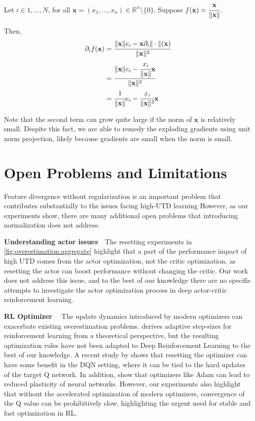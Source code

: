 Let $i \in {1, ..., N}$, for all $\mathbf{x} = (x_1, ..., x_n) \in \mathbb{R}^n \setminus \{0\}$. Suppose $f(\mathbf{x}) = \cfrac{\mathbf{x}}{\| \mathbf{x} \|}$. 

Then, 
\begin{align}
    \partial_i f(\mathbf{x}) 
    &= \cfrac{\| \mathbf{x} \| e_i - \mathbf{x} \partial_i \| \cdot \| (\mathbf{x}) }{\|\mathbf{x} \|^2} \\
    &= \cfrac{\| \mathbf{x} \| e_i - \cfrac{x_i}{\|\mathbf{x} \|} \mathbf{x}}{\|\mathbf{x} \|^2} \\
    &= \cfrac{1}{\|\mathbf{x} \|} e_i - \cfrac{x_i}{\|\mathbf{x} \|^3} \mathbf{x}
\end{align}

Note that the second term can grow quite large if the norm of $\mathbf{x}$ is relatively small. Despite this fact, we are able to remedy the exploding gradients using unit norm projection, likely because gradients are small when the norm is small.

\section{Open Problems and Limitations} \label{app:open}

Feature divergence without regularization is an important problem that contributes substantially to the issues facing high-UTD learning
However, as our experiments show, there are many additional open problems that introducing normalization does not address.

\textbf{Understanding actor issues}~~The resetting experiments in \autoref{fig:overestimation:aggregate} highlight that a part of the performance impact of high UTD comes from the actor optimization, not the critic optimization, as resetting the actor can boost performance without changing the critic.
Our work does not address this issue, and to the best of our knowledge there are no specific attempts to investigate the actor optimization process in deep actor-critic reinforcement learning.

{\bf RL Optimizer}~~ The update dynamics introduced by modern optimizers can exacerbate existing overestimation problems. 
\textcite{dabney2014adaptive} derives adaptive step-sizes for reinforcement learning from a theoretical perspective, but the resulting optimization rules have not been adapted to Deep Reinforcement Learning to the best of our knowledge.
A recent study by \textcite{asadi2023resetting} shows that resetting the optimizer can have some benefit in the DQN setting, where it can be tied to the hard updates of the target Q network.
In addition, \textcite{lyle2023understanding} show that optimizers like Adam can lead to reduced plasticity of neural networks.
However, our experiments also highlight that without the accelerated optimization of modern optimizers, convergence of the Q value can be prohibitively slow, highlighting the urgent need for stable and fast optimization in RL.

